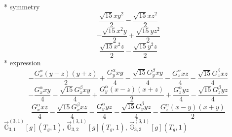 \documentclass[fleqn,8pt]{jsarticle}
\begin{document}
\noindent\quad ** symmetry
\begin{dmath*}
\frac{\sqrt{15} x y^{2}}{2} - \frac{\sqrt{15} x z^{2}}{2}
\end{dmath*}
\begin{dmath*}
- \frac{\sqrt{15} x^{2} y}{2} + \frac{\sqrt{15} y z^{2}}{2}
\end{dmath*}
\begin{dmath*}
\frac{\sqrt{15} x^{2} z}{2} - \frac{\sqrt{15} y^{2} z}{2}
\end{dmath*}
\noindent\quad ** expression
\begin{dmath*}
- \frac{G_{x}^{\alpha} \left(y - z\right) \left(y + z\right)}{2} + \frac{G_{y}^{\alpha} x y}{4} - \frac{\sqrt{15} G_{y}^{\beta} x y}{4} - \frac{G_{z}^{\alpha} x z}{4} - \frac{\sqrt{15} G_{z}^{\beta} x z}{4}
\end{dmath*}
\begin{dmath*}
- \frac{G_{x}^{\alpha} x y}{4} - \frac{\sqrt{15} G_{x}^{\beta} x y}{4} + \frac{G_{y}^{\alpha} \left(x - z\right) \left(x + z\right)}{2} + \frac{G_{z}^{\alpha} y z}{4} - \frac{\sqrt{15} G_{z}^{\beta} y z}{4}
\end{dmath*}
\begin{dmath*}
\frac{G_{x}^{\alpha} x z}{4} - \frac{\sqrt{15} G_{x}^{\beta} x z}{4} - \frac{G_{y}^{\alpha} y z}{4} - \frac{\sqrt{15} G_{y}^{\beta} y z}{4} - \frac{G_{z}^{\alpha} \left(x - y\right) \left(x + y\right)}{2}
\end{dmath*}
\noindent\quad $\vec{\mathbb{G}}_{3,1}^{(3,1)}[g](T_{g},1)$, $\vec{\mathbb{G}}_{3,2}^{(3,1)}[g](T_{g},1)$, $\vec{\mathbb{G}}_{3,3}^{(3,1)}[g](T_{g},1)$
\end{document}
